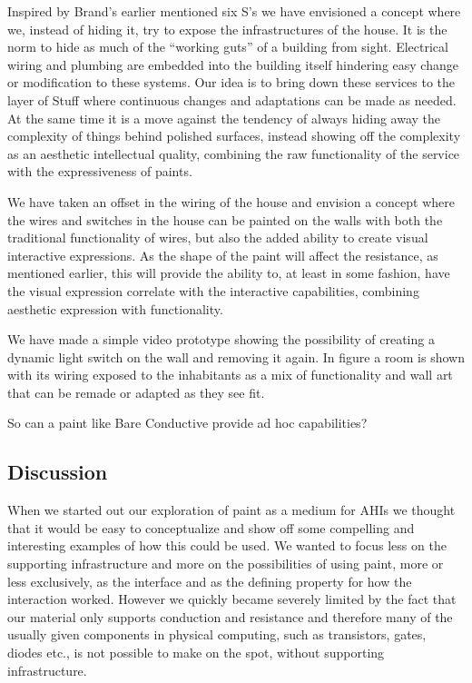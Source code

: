 Inspired by Brand's earlier mentioned six S's \citep{brand1995buildings} we have envisioned a concept where we, instead of hiding it, try to expose the infrastructures of the house.
It is the norm to hide as much of the ``working guts'' of a building from sight.
Electrical wiring and plumbing are embedded into the building itself hindering easy change or modification to these systems.
Our idea is to bring down these services to the layer of Stuff where continuous changes and adaptations can be made as needed.
At the same time it is a move against the tendency of always hiding away the complexity of things behind polished surfaces, instead showing off the complexity as an aesthetic intellectual quality, combining the raw functionality of the service with the expressiveness of paints.

We have taken an offset in the wiring of the house and envision a concept where the wires and switches in the house can be painted on the walls with both the traditional functionality of wires, but also the added ability to create visual interactive expressions.
As the shape of the paint will affect the resistance, as mentioned earlier, this will provide the ability to, at least in some fashion, have the visual expression correlate with the interactive capabilities, combining aesthetic expression with functionality.

We have made a simple video prototype showing the possibility of creating a dynamic light switch on the wall and removing it again.
In figure  a room is shown with its wiring exposed to the inhabitants as a mix of functionality and wall art that can be remade or adapted as they see fit.

So can a paint like Bare Conductive provide ad hoc capabilities?

\subsection{Discussion}
When we started out our exploration of paint as a medium for AHIs we thought that it would be easy to conceptualize and show off some compelling and interesting examples of how this could be used.
We wanted to focus less on the supporting infrastructure and more on the possibilities of using paint, more or less exclusively, as the interface and as the defining property for how the interaction worked. 
However we quickly became severely limited by the fact that our material only supports conduction and resistance and therefore many of the usually given components in physical computing, such as transistors, gates, diodes etc., is not possible to make on the spot, without supporting infrastructure.  

